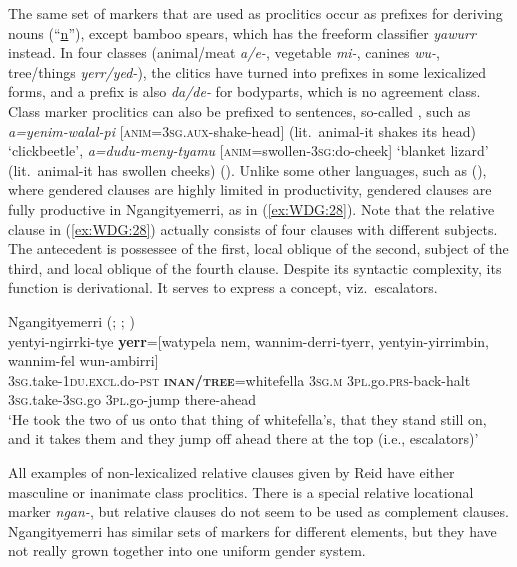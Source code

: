 \documentclass[output=collectionpaper]{langsci/langscibook}
\begin{document}
The same set of markers that are used as proclitics occur as prefixes for deriving nouns (``\uline{n}''), except bamboo spears, which has the freeform classifier \textit{yawurr} instead. In four classes (animal/meat \textit{a/e-}, vegetable \textit{mi-}, canines \textit{wu-}, tree/things \textit{yerr/yed-}), the clitics have turned into prefixes in some lexicalized forms, and a prefix is also \textit{da/de-} for bodyparts, which is no agreement class. Class marker proclitics can also be prefixed to sentences, so-called , such as \textit{a=yenim-walal-pi} [\textsc{anim=3sg.aux}-shake-head] (lit.\ animal-it shakes its head) `clickbeetle', \textit{a=dudu-meny-tyamu} [\textsc{anim}=swollen-3\textsc{sg}:do-cheek] `blanket lizard' (lit.\ animal-it has swollen cheeks) (\citealt[210]{Reid1997}). Unlike some other  languages, such as  (), where gendered clauses are highly limited in productivity, gendered clauses are fully productive in Ngan\textquotesingle{}gityemerri, as in (\ref{ex:WDG:28}). Note that the relative clause in (\ref{ex:WDG:28}) actually consists of four clauses with different subjects. The antecedent is possessee of the first, local oblique of the second, subject of the third, and local oblique of the fourth clause. Despite its syntactic complexity, its function is derivational. It serves to express a concept, viz.\ escalators.

\ea\label{ex:WDG:28}
Ngan\textquotesingle{}gityemerri  (; \citealt[380]{Reid1990}; \citealt[205]{Reid1997})\\
\gll yentyi-ngirrki-tye	\textbf{yerr}=[watypela 	nem, 	wannim-derri-tyerr, yentyin-yirrimbin, 	wannim-fel 	wun-ambirri]\\
\textsc{3sg}.take-\textsc{1du.excl}.do-\textsc{pst} 	\textbf{\textsc{inan/tree}}=whitefella 	\textsc{3sg.m} 	\textsc{3pl}.go.\textsc{prs}-back-halt \textsc{3sg}.take-\textsc{3sg}.go 	\textsc{3pl}.go-jump 	there-ahead\\
\glt `He took the two of us onto that thing of whitefella's, that they stand still on, and it takes them and they jump off ahead there at the top (i.e., escalators)'\\
\z

All examples of non-lexicalized relative clauses given by Reid have either masculine or inanimate class proclitics. There is a special relative locational marker \textit{ngan-}, but relative clauses do not seem to be used as complement clauses. Ngan\textquotesingle{}gityemerri has similar sets of markers for different elements, but they have not really grown together into one uniform gender system.
\end{document}
